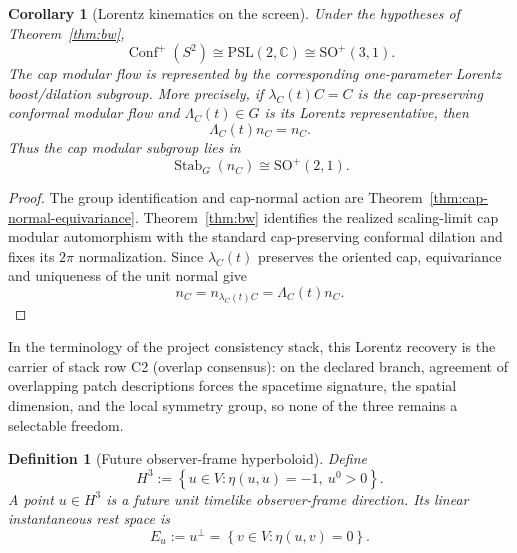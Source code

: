 \documentclass[11pt]{article}
\newtheorem{corollary}[theorem]{Corollary}
\newtheorem{definition}[theorem]{Definition}
\begin{document}
\begin{corollary}[Lorentz kinematics on the screen]\label{cor:lorentz}
Under the hypotheses of Theorem~\ref{thm:bw},
\[
\operatorname{Conf}^{+}(S^2)\cong \mathrm{PSL}(2,\mathbb C)
\cong \mathrm{SO}^{+}(3,1).
\]
The cap modular flow is represented by the corresponding one-parameter
Lorentz boost/dilation subgroup. More precisely, if \(\lambda_C(t)C=C\) is
the cap-preserving conformal modular flow and \(\Lambda_C(t)\in G\) is its
Lorentz representative, then
\[
\boxed{
\Lambda_C(t)n_C=n_C.
}
\]
Thus the cap modular subgroup lies in
\[
\operatorname{Stab}_G(n_C)\cong\mathrm{SO}^{+}(2,1).
\]
\end{corollary}

\begin{proof}
The group identification and cap-normal action are
Theorem~\ref{thm:cap-normal-equivariance}. Theorem~\ref{thm:bw} identifies
the realized scaling-limit cap modular automorphism with the standard
cap-preserving conformal dilation and fixes its \(2\pi\) normalization. Since
\(\lambda_C(t)\) preserves the oriented cap, equivariance and uniqueness of
the unit normal give
\[
n_C=n_{\lambda_C(t)C}=\Lambda_C(t)n_C.
\]
\end{proof}

In the terminology of the project consistency stack, this Lorentz recovery
is the carrier of stack row C2 (overlap consensus): on the declared branch, agreement of
overlapping patch descriptions forces the spacetime signature, the spatial dimension, and the
local symmetry group, so none of the three remains a selectable freedom.

\begin{definition}[Future observer-frame hyperboloid]\label{def:h3-observer-frames}
Define
\[
H^3:=\left\{u\in V:\eta(u,u)=-1,\ u^0>0\right\}.
\]
A point \(u\in H^3\) is a future unit timelike observer-frame direction. Its
linear instantaneous rest space is
\[
E_u:=u^\perp=\left\{v\in V:\eta(u,v)=0\right\}.
\]
\end{definition}
\end{document}
